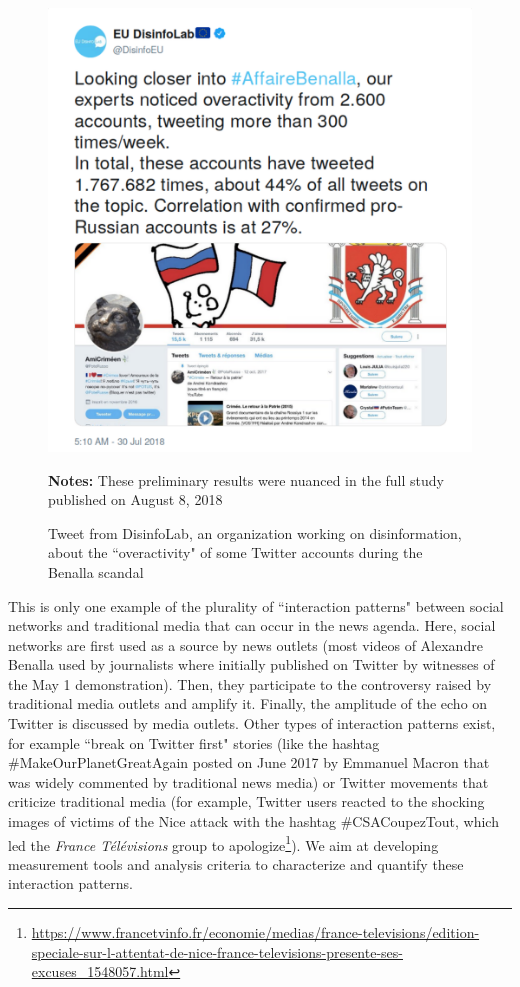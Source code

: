 \begin{figure}
\begin{center}
\includegraphics[scale=.35]{figures/Screenshot_DisinfoLab_AffaireBenalla.pdf}
\end{center}
{\scriptsize \textbf{Notes:} These preliminary results were nuanced in the full study published on August 8, 2018}
\caption{Tweet from DisinfoLab, an organization working on disinformation, about the ``overactivity" of some Twitter accounts during the Benalla scandal}
\label{Figure:DisinfoLab}
\end{figure}

This is only one example of the plurality of ``interaction patterns" \citep{ning_uncovering_2015} between social networks and traditional media that can occur in the news agenda. Here, social networks are first used as a source by news outlets (most videos of Alexandre Benalla used by journalists where initially published on Twitter by witnesses of the May 1 demonstration). Then, they participate to the controversy raised by traditional media outlets and amplify it. Finally, the amplitude of the echo on Twitter is discussed by media outlets. Other types of interaction patterns exist, for example ``break on Twitter first" stories (like the hashtag \#MakeOurPlanetGreatAgain posted on June 2017 by Emmanuel Macron that was widely commented by traditional news media) or Twitter movements that criticize traditional media (for example, Twitter users reacted to the shocking images of victims of the Nice attack with the hashtag \#CSACoupezTout, which led the \textit{France Télévisions} group to apologize\footnote{\url{https://www.francetvinfo.fr/economie/medias/france-televisions/edition-speciale-sur-l-attentat-de-nice-france-televisions-presente-ses-excuses_1548057.html}}). We aim at developing measurement tools and analysis criteria to characterize and quantify these interaction patterns.


